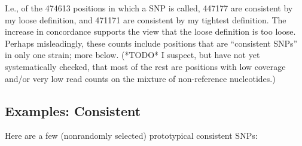 \documentclass{article}\usepackage[]{graphicx}\usepackage[]{color}
\begin{document}
\noindent I.e., of the 474613 positions in which a SNP is called, 447177 are
consistent by my loose definition, and 471171 are consistent by my tightest definition.  The
increase in concordance supports the view that the loose definition is too loose.  Perhaps misleadingly, these counts
include positions that are ``consistent SNPs'' in only one strain; more below.  (*TODO* I suspect, but have not yet
systematically checked, that most of the rest are positions with low coverage and/or very low read counts on the mixture
of non-reference nucleotides.)

\subsection{Examples: Consistent}
Here are a few (nonrandomly selected) prototypical consistent SNPs:
\end{document}
